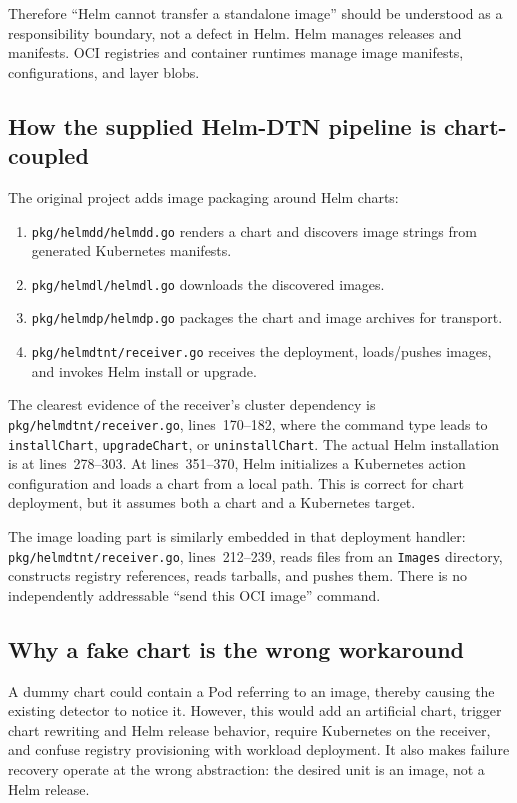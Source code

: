 \documentclass[11pt,a4paper]{article}
\newcommand{\file}[1]{\texttt{#1}}
\newcommand{\lines}[1]{lines~#1}
\begin{document}
Therefore ``Helm cannot transfer a standalone image'' should be understood as
a responsibility boundary, not a defect in Helm. Helm manages releases and
manifests. OCI registries and container runtimes manage image manifests,
configurations, and layer blobs.

\subsection{How the supplied Helm-DTN pipeline is chart-coupled}
The original project adds image packaging around Helm charts:
\begin{enumerate}[leftmargin=*]
\item \file{pkg/helmdd/helmdd.go} renders a chart and discovers image strings
from generated Kubernetes manifests.
\item \file{pkg/helmdl/helmdl.go} downloads the discovered images.
\item \file{pkg/helmdp/helmdp.go} packages the chart and image archives for
transport.
\item \file{pkg/helmdtnt/receiver.go} receives the deployment, loads/pushes
images, and invokes Helm install or upgrade.
\end{enumerate}

The clearest evidence of the receiver's cluster dependency is
\file{pkg/helmdtnt/receiver.go}, \lines{170--182}, where the command type leads
to \file{installChart}, \file{upgradeChart}, or \file{uninstallChart}. The
actual Helm installation is at \lines{278--303}. At \lines{351--370}, Helm
initializes a Kubernetes action configuration and loads a chart from a local
path. This is correct for chart deployment, but it assumes both a chart and a
Kubernetes target.

The image loading part is similarly embedded in that deployment handler:
\file{pkg/helmdtnt/receiver.go}, \lines{212--239}, reads files from an
\file{Images} directory, constructs registry references, reads tarballs, and
pushes them. There is no independently addressable ``send this OCI image''
command.

\subsection{Why a fake chart is the wrong workaround}
A dummy chart could contain a Pod referring to an image, thereby causing the
existing detector to notice it. However, this would add an artificial chart,
trigger chart rewriting and Helm release behavior, require Kubernetes on the
receiver, and confuse registry provisioning with workload deployment. It also
makes failure recovery operate at the wrong abstraction: the desired unit is
an image, not a Helm release.
\end{document}
